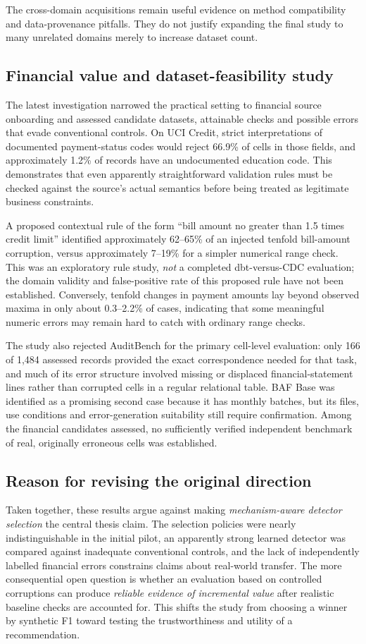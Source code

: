 \documentclass[10pt,a4paper]{article}
\begin{document}
The cross-domain acquisitions remain useful evidence on method compatibility and data-provenance pitfalls. They do not justify expanding the final study to many unrelated domains merely to increase dataset count.

\subsection{Financial value and dataset-feasibility study}
The latest investigation narrowed the practical setting to financial source onboarding and assessed candidate datasets, attainable checks and possible errors that evade conventional controls. On UCI Credit, strict interpretations of documented payment-status codes would reject 66.9\% of cells in those fields, and approximately 1.2\% of records have an undocumented education code. This demonstrates that even apparently straightforward validation rules must be checked against the source's actual semantics before being treated as legitimate business constraints.

A proposed contextual rule of the form ``bill amount no greater than 1.5 times credit limit'' identified approximately 62--65\% of an injected tenfold bill-amount corruption, versus approximately 7--19\% for a simpler numerical range check. This was an exploratory rule study, \emph{not} a completed dbt-versus-CDC evaluation; the domain validity and false-positive rate of this proposed rule have not been established. Conversely, tenfold changes in payment amounts lay beyond observed maxima in only about 0.3--2.2\% of cases, indicating that some meaningful numeric errors may remain hard to catch with ordinary range checks.

The study also rejected AuditBench for the primary cell-level evaluation: only 166 of 1,484 assessed records provided the exact correspondence needed for that task, and much of its error structure involved missing or displaced financial-statement lines rather than corrupted cells in a regular relational table. BAF Base was identified as a promising second case because it has monthly batches, but its files, use conditions and error-generation suitability still require confirmation. Among the financial candidates assessed, no sufficiently verified independent benchmark of real, originally erroneous cells was established.

\subsection{Reason for revising the original direction}
Taken together, these results argue against making \emph{mechanism-aware detector selection} the central thesis claim. The selection policies were nearly indistinguishable in the initial pilot, an apparently strong learned detector was compared against inadequate conventional controls, and the lack of independently labelled financial errors constrains claims about real-world transfer. The more consequential open question is whether an evaluation based on controlled corruptions can produce \emph{reliable evidence of incremental value} after realistic baseline checks are accounted for. This shifts the study from choosing a winner by synthetic F1 toward testing the trustworthiness and utility of a recommendation.
\end{document}
